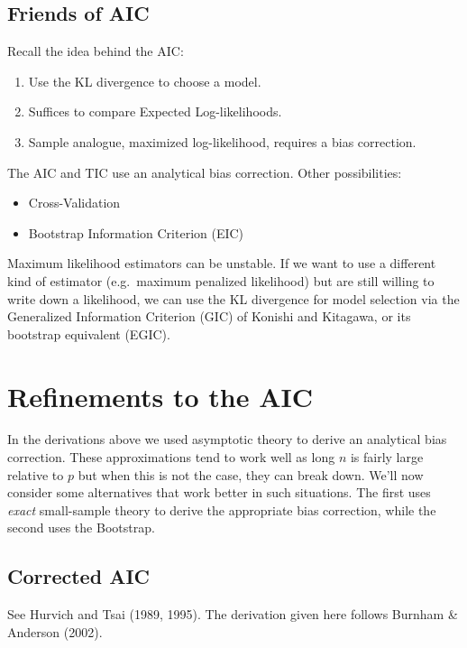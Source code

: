 \documentclass[12pt]{article}
\theoremstyle{definition}
\begin{document}
\subsection{Friends of AIC}
Recall the idea behind the AIC:
	\begin{enumerate}
		\item Use the KL divergence to choose a model.
		\item Suffices to compare Expected Log-likelihoods. 
		\item Sample analogue, maximized log-likelihood, requires a bias correction.
	\end{enumerate}
The AIC and TIC use an analytical bias correction. Other possibilities:
	\begin{itemize}
		\item Cross-Validation
		\item Bootstrap Information Criterion (EIC)
	\end{itemize}
Maximum likelihood estimators can be unstable. If we want to use a different kind of estimator (e.g.\ maximum penalized likelihood) but are still willing to write down a likelihood, we can use the KL divergence for model selection via the Generalized Information Criterion (GIC) of Konishi and Kitagawa, or its bootstrap equivalent (EGIC).

\section{Refinements to the AIC}
In the derivations above we used asymptotic theory to derive an analytical bias correction. These approximations tend to work well as long $n$ is fairly large relative to $p$ but when this is not the case, they can break down. We'll now consider some alternatives that work better in such situations. The first uses \emph{exact} small-sample theory to derive the appropriate bias correction, while the second uses the Bootstrap.


\subsection{Corrected AIC}
See Hurvich and Tsai (1989, 1995). The derivation given here follows Burnham \& Anderson (2002).
\end{document}
